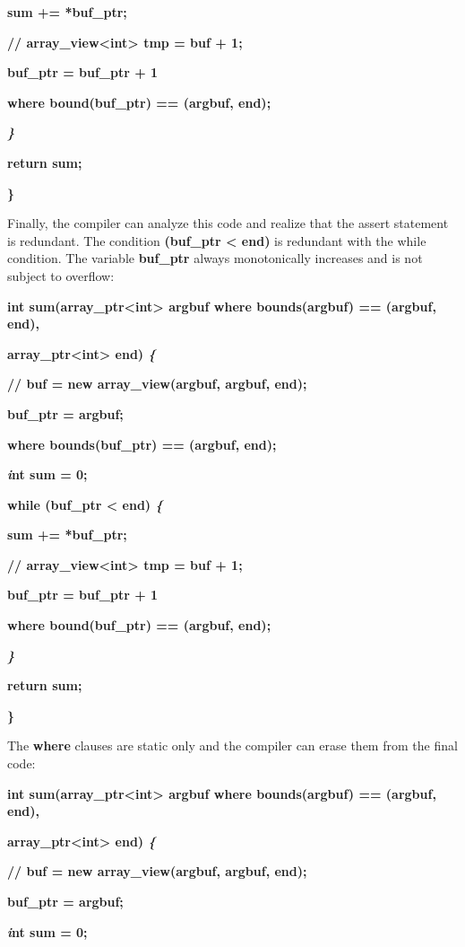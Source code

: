 \documentclass[]{article}
\begin{document}
\textbf{sum += *buf\_ptr;}

\textbf{// array\_view\textless{}int\textgreater{} tmp = buf + 1;}

\textbf{buf\_ptr = buf\_ptr + 1}

\textbf{where bound(buf\_ptr) == (argbuf, end);}

\emph{\textbf{\}}}

\textbf{return sum;}

\textbf{\}}

Finally, the compiler can analyze this code and realize that the assert
statement is redundant. The condition \textbf{(buf\_ptr \textless{}
end)} is redundant with the while condition. The variable
\textbf{buf\_ptr} always monotonically increases and is not subject to
overflow:

\textbf{int sum(array\_ptr\textless{}int\textgreater{} argbuf where
bounds(argbuf) == (argbuf, end), }

\textbf{array\_ptr\textless{}int\textgreater{} end) \emph{\{}}

\textbf{// buf = new array\_view(argbuf, argbuf, end);}

\textbf{buf\_ptr = argbuf;}

\textbf{where bounds(buf\_ptr) == (argbuf, end);}

\textbf{\emph{i}nt sum = 0;}

\textbf{while (buf\_ptr \textless{} end) \emph{\{}}

\textbf{sum += *buf\_ptr;}

\textbf{// array\_view\textless{}int\textgreater{} tmp = buf + 1;}

\textbf{buf\_ptr = buf\_ptr + 1}

\textbf{where bound(buf\_ptr) == (argbuf, end);}

\emph{\textbf{\}}}

\textbf{return sum;}

\textbf{\}}

The \textbf{where} clauses are static only and the compiler can erase
them from the final code:

\textbf{int sum(array\_ptr\textless{}int\textgreater{} argbuf where
bounds(argbuf) == (argbuf, end), }

\textbf{array\_ptr\textless{}int\textgreater{} end) \emph{\{}}

\textbf{// buf = new array\_view(argbuf, argbuf, end);}

\textbf{buf\_ptr = argbuf;}

\textbf{\emph{i}nt sum = 0;}
\end{document}

